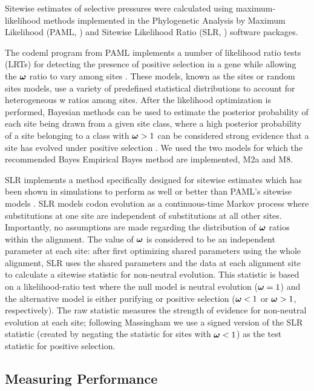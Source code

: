 \documentclass{mbe}
\begin{document}
Sitewise estimates of selective pressures were calculated using
maximum-likelihood methods implemented in the Phylogenetic Analysis by
Maximum Likelihood (PAML, \citealt{Yang2007PAML}) and Sitewise Likelihood Ratio
(SLR, \citealt{Massingham2005Detecting}) software packages.

The codeml program from PAML implements a number of likelihood ratio
tests (LRTs) for detecting the presence of positive selection in a
gene while allowing the $\bm{\omega}{}$ ratio to vary among sites
\citep{Yang2000CodonSubstitution}. These models, known as the sites or
random sites models, use a variety of predefined statistical
distributions to account for heterogeneous w ratios among sites. After
the likelihood optimization is performed, Bayesian methods can be used
to estimate the posterior probability of each site being drawn from a
given site class, where a high posterior probability of a site
belonging to a class with $\bm{\omega}{}>1$ can be considered strong
evidence that a site has evolved under positive selection
\citep{Yang2005Bayes}. We used the two models for which the
recommended Bayes Empirical Bayes method are implemented, M2a and M8.

SLR implements a method specifically designed for sitewise estimates
which has been shown in simulations to perform as well or better than
PAML's sitewise models \citep{Massingham2005Detecting}. SLR models
codon evolution as a continuous-time Markov process where
substitutions at one site are independent of substitutions at all
other sites. Importantly, no assumptions are made regarding the
distribution of $\bm{\omega}{}$ ratios within the alignment. The value
of $\bm{\omega}{}$ is considered to be an independent parameter at each
site: after first optimizing shared parameters using the whole
alignment, SLR uses the shared parameters and the data at each
alignment site to calculate a sitewise statistic for non-neutral
evolution. This statistic is based on a likelihood-ratio test where
the null model is neutral evolution ($\bm{\omega}{}=1$) and the
alternative model is either purifying or positive selection
($\bm{\omega}{}<1$ or $\bm{\omega}{}>1$, respectively). The raw statistic
measures the strength of evidence for non-neutral evolution at each
site; following Massingham \citeyearpar{Massingham2005Detecting} we
use a signed version of the SLR statistic (created by negating the
statistic for sites with $\bm{\omega}{}<1$) as the test statistic for
positive selection.

\subsection*{Measuring Performance}
\end{document}
